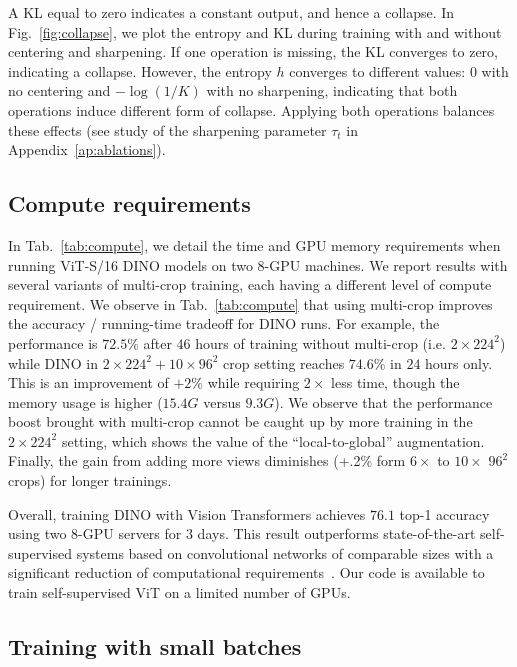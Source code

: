 A KL equal to zero indicates a constant output, and hence a collapse. In Fig.~\ref{fig:collapse}, we plot the entropy and KL during training with and without centering and sharpening. If one operation is missing, the KL converges to zero, indicating a collapse. However, the entropy $h$ converges to different values: $0$ with no centering and $-\log(1/K)$ with no sharpening, indicating that both operations induce different form of collapse. Applying both operations balances these effects (see study of the sharpening parameter $\tau_t$ in Appendix~\ref{ap:ablations}).

\subsection{Compute requirements}

In Tab.~\ref{tab:compute}, we detail the time and GPU memory requirements when running ViT-S/16 DINO models on two $8$-GPU machines. We report results with several variants of multi-crop training, each having a different level of compute requirement. We observe in Tab.~\ref{tab:compute} that using multi-crop improves the accuracy / running-time tradeoff for DINO runs. For example, the performance is $72.5\%$ after $46$ hours of training without multi-crop (i.e. $2\!\times\!224^2$) while DINO in $2\!\times\!224^2 + 10\!\times\!96^2$ crop setting reaches $74.6\%$ in $24$ hours only. This is an improvement of $+2\%$ while requiring $2\!\times$ less time, though the memory usage is higher ($15.4G$ versus $9.3G$). We observe that the performance boost brought with multi-crop cannot be caught up by more training in the $2\!\times\!224^2$ setting, which shows the value of the ``local-to-global'' augmentation. Finally, the gain from adding more views diminishes (+.2\% form $6\!\times$ to $10\!\times$ $96^2$ crops) for longer trainings.

Overall, training DINO with Vision Transformers achieves $76.1$ top-1 accuracy using two 8-GPU servers for 3 days. This result outperforms state-of-the-art self-supervised systems based on convolutional networks of comparable sizes with a significant reduction of computational requirements~\cite{grill2020bootstrap,caron2020unsupervised}. Our code is available to train self-supervised ViT on a limited number of GPUs.

\subsection{Training with small batches}
\label{sec:smallbs}

